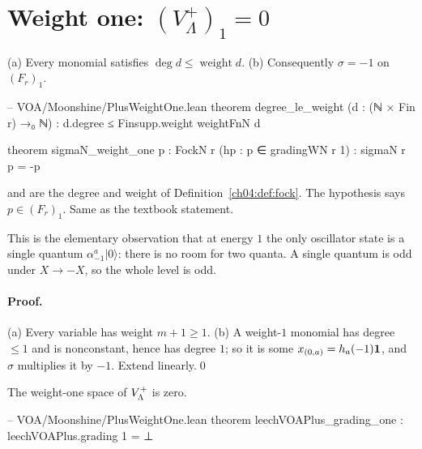 \section{Weight one: \texorpdfstring{$(V_\Lambda^+)_1=0$}{(V+)1 = 0}}\label{ch04:sec:wtone}

\begin{lemma}\label{ch04:lem:degwt}
(a) Every monomial satisfies $\deg d\le\operatorname{weight}d$. (b) Consequently $\sigma=-1$ on
$(F_r)_1$.
\end{lemma}

\begin{leancode}
-- VOA/Moonshine/PlusWeightOne.lean
theorem degree_le_weight (d : (ℕ × Fin r) →₀ ℕ) :
    d.degree ≤ Finsupp.weight weightFnN d

theorem sigmaN_weight_one {p : FockN r} (hp : p ∈ gradingWN r 1) : sigmaN r p = -p
\end{leancode}

\begin{dictionary}
 and  are the degree and weight of
Definition~\ref{ch04:def:fock}. The hypothesis  says $p\in(F_r)_1$. Same as the textbook
statement.
\end{dictionary}

\begin{physics}
This is the elementary observation that at energy $1$ the only oscillator state is a single quantum $\alpha^a_{-1}|0\rangle$: there is no room for two quanta. A single quantum is odd under $X\to-X$, so the whole level is odd.
\end{physics}

\paragraph{Proof.} (a) Every variable has weight $m+1\ge1$. (b) A weight-$1$ monomial has degree
$\le1$ and is nonconstant, hence has degree $1$; so it is some $x_{(0,a)}=h_a(-1)\mathbf{1}$, and
$\sigma$ multiplies it by $-1$. Extend linearly.\qed

\begin{theorem}[$(V_\Leech^+)_1=0$]\label{ch04:thm:wtone}
The weight-one space of $V_{\Lambda}^+$ is zero.
\end{theorem}

\begin{leancode}
-- VOA/Moonshine/PlusWeightOne.lean
theorem leechVOAPlus_grading_one : leechVOAPlus.grading 1 = ⊥
\end{leancode}

